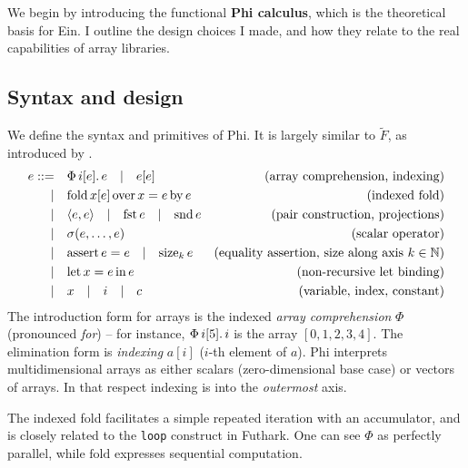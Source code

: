 We begin by introducing the functional \textbf{Phi calculus}, which is the theoretical basis for Ein. I outline the design choices I made, and how they relate to the real capabilities of array libraries.

\subsection{Syntax and design}

\newcommand{\philet}[3]{\mathrm{let}\,{#1}={#2}\,\mathrm{in}\,{#3}}
\newcommand{\phivec}[3]{\Phi\, {#1}[{#2}] \ldotp {#3}}
\newcommand{\phifold}[5]{\mathrm{fold}\,{#1}[{#2}]\,\mathrm{over}\,{#3} = {#4}\,\mathrm{by}\,{#5}}
\newcommand{\phipair}[2]{\left\langle {#1}, {#2} \right\rangle}
\newcommand{\phifst}[1]{\mathrm{fst}\,{#1}}
\newcommand{\phisnd}[1]{\mathrm{snd}\,{#1}}
\newcommand{\phisize}[2]{\mathrm{size}_{#2}\, {#1}}
\newcommand{\phiasserteq}[2]{\mathrm{assert}\,{#1}={#2}}

We define the syntax and primitives of Phi. It is largely similar to $\tilde F$, as introduced by \textcite{shaikhha2019efficient}.
\begin{align*}
e ::=&\quad \phivec{i}{e}{e} \quad|\quad e[e]   &\text{(array comprehension, indexing)} \\
|&\quad \phifold{x}{e}{x}{e}{e}  &\text{(indexed fold)} \\
|&\quad \phipair{e}{e} \quad|\quad \phifst{e} \quad|\quad \phisnd{e} &\text{(pair construction, projections)} \\
|&\quad \sigma(e, \dots, e) &\text{(scalar operator)} \\
|&\quad \phiasserteq{e}{e} \quad|\quad \phisize{e}{k} &\text{(equality assertion, size along axis } k \in \mathbb N \text{)} \\
|&\quad \philet{x}{e}{e} &\text{(non-recursive let binding)} \\
|&\quad x \quad|\quad i \quad|\quad c &\text{(variable, index, constant)}
\end{align*}
The introduction form for arrays is the indexed \textit{array comprehension} $\Phi$ (pronounced \textit{for}) -- for instance, $\phivec{i}{5}{i}$ is the array $[0, 1, 2, 3, 4]$. The elimination form is \textit{indexing} $a[i]$ ($i$-th element of $a$). Phi interprets multidimensional arrays as either scalars (zero-dimensional base case) or vectors of arrays. In that respect indexing is into the \textit{outermost} axis. 

The indexed fold facilitates a simple repeated iteration with an accumulator, and is closely related to the \texttt{loop} construct in Futhark. One can see $\Phi$ as perfectly parallel, while $\mathrm{fold}$ expresses sequential computation.

